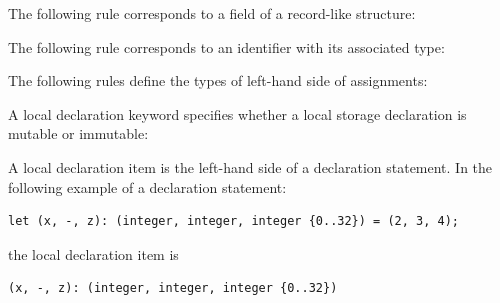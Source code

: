 
\hypertarget{constant-zerobit}{}
\hypertarget{constant-onebit}{}
\hypertarget{constant-xbit}{}







The following rule corresponds to a field of a record-like structure:

The following rule corresponds to an identifier with its associated type:

The following rules define the types of left-hand side of assignments:

A local declaration keyword specifies whether a local storage declaration is mutable or immutable:

A local declaration item is the left-hand side of a declaration statement.
In the following example of a declaration statement:
\begin{lstlisting}
let (x, -, z): (integer, integer, integer {0..32}) = (2, 3, 4);
\end{lstlisting}
the local declaration item is
\begin{lstlisting}
(x, -, z): (integer, integer, integer {0..32})
\end{lstlisting}


